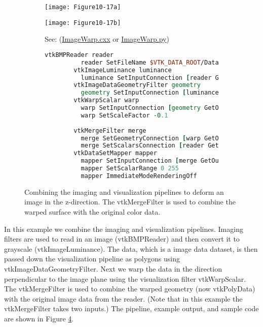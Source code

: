 \begin{figure}[htb]
    \centering
	\begin{subfigure}[h]{0.48\linewidth}
		\texttt{[image: Figure10-17a]}
		\captionsetup{justification=centering}
		\caption*{}
		\label{fig:Figure10-17a}
	\end{subfigure}
	\hfill
	\begin{subfigure}[h]{0.48\linewidth}
		\texttt{[image: Figure10-17b]}
		\captionsetup{justification=centering}
		\caption*{See: (\href{https://lorensen.github.io/VTKExamples/site/Cxx/Images/ImageWarp/}{ImageWarp.cxx} or \href{https://lorensen.github.io/VTKExamples/site/Python/Images/ImageWarp/}{ImageWarp.py})}
        \label{fig:Figure10-17b}
	\end{subfigure}
	\hfill
	\begin{subfigure}[h]{0.96\linewidth}
       \begin{lstlisting}[language=TCL,  caption={}, numbers=none, frame=none]
        vtkBMPReader reader
          reader SetFileName $VTK_DATA_ROOT/Data/masonry.bmp
        vtkImageLuminance luminance
          luminance SetInputConnection [reader GetOutputPort]
        vtkImageDataGeometryFilter geometry
          geometry SetInputConnection [luminance GetOutputPort]
        vtkWarpScalar warp
          warp SetInputConnection [geometry GetOutputPort]
          warp SetScaleFactor -0.1
          
        vtkMergeFilter merge
          merge SetGeometryConnection [warp GetOutputPort]
          merge SetScalarsConnection [reader GetOutputPort]
        vtkDataSetMapper mapper
          mapper SetInputConnection [merge GetOutputPort]
          mapper SetScalarRange 0 255
          mapper ImmediateModeRenderingOff
        \end{lstlisting}
        \label{fig:Figure10-17d}
	\end{subfigure}
	\caption{Combining the imaging and visualization pipelines to deform an image in the z-direction. The vtkMergeFilter is used to combine the warped surface with the original color data.}\label{fig:Figure10-17}
\end{figure}

In this example we combine the imaging and visualization pipelines. Imaging filters are used to read in an image (vtkBMPReader) and then convert it to grayscale (vtkImageLuminance). The data, which is a image data dataset, is then passed down the visualization pipeline as polygons using vtkImageDataGeometryFilter. Next we warp the data in the direction perpendicular to the image plane using the visualization filter vtkWarpScalar. The vtkMergeFilter is used to combine the warped geometry (now vtkPolyData) with the original image data from the reader. (Note that in this example the vtkMergeFilter takes two inputs.) The pipeline, example output, and sample code are shown in Figure \ref{fig:Figure10-17}.

